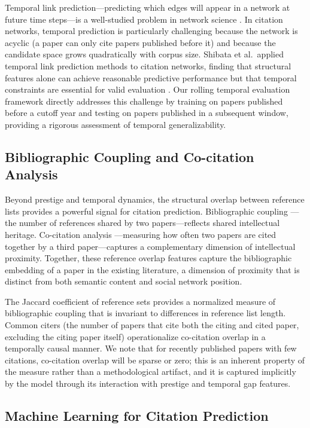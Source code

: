\documentclass[12pt,a4paper]{article}
\begin{document}
Temporal link prediction---predicting which edges will appear in a network at
future time steps---is a well-studied problem in network science
\citep{liben2007link}. In citation networks, temporal prediction is particularly
challenging because the network is acyclic (a paper can only cite papers published
before it) and because the candidate space grows quadratically with corpus size.
Shibata et al.\ applied temporal link prediction methods to citation networks,
finding that structural features alone can achieve reasonable predictive performance
but that temporal constraints are essential for valid evaluation \citep{shibata2012link}.
Our rolling temporal evaluation framework directly addresses this challenge by
training on papers published before a cutoff year and testing on papers published
in a subsequent window, providing a rigorous assessment of temporal generalizability.

\subsection{Bibliographic Coupling and Co-citation Analysis}

Beyond prestige and temporal dynamics, the structural overlap between reference
lists provides a powerful signal for citation prediction. Bibliographic coupling
\citep{kessler1963bibliographic}---the number of references shared by two
papers---reflects shared intellectual heritage. Co-citation analysis
\citep{small1973co}---measuring how often two papers are cited together by a
third paper---captures a complementary dimension of intellectual proximity.
Together, these reference overlap features capture the bibliographic embedding of
a paper in the existing literature, a dimension of proximity that is distinct from
both semantic content and social network position.

The Jaccard coefficient of reference sets provides a normalized measure of
bibliographic coupling that is invariant to differences in reference list length.
Common citers (the number of papers that cite both the citing and cited paper,
excluding the citing paper itself) operationalize co-citation overlap in a
temporally causal manner. We note that for recently published papers with few
citations, co-citation overlap will be sparse or zero; this is an inherent property
of the measure rather than a methodological artifact, and it is captured implicitly
by the model through its interaction with prestige and temporal gap features.

\subsection{Machine Learning for Citation Prediction}
\end{document}
